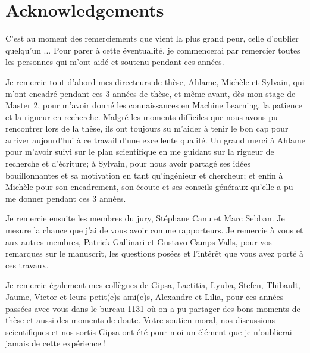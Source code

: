 \chapter*{Acknowledgements}



C'est au moment des remerciements que vient la plus grand peur, celle d'oublier quelqu'un ... Pour parer à cette éventualité, je commencerai par remercier toutes les personnes qui m'ont aidé et soutenu pendant ces années.

Je remercie tout d'abord mes directeurs de thèse, Ahlame, Michèle et Sylvain, qui m'ont encadré pendant ces 3 années de thèse, et même avant, dès mon stage de Master 2, pour m'avoir donné les connaissances en Machine Learning, la patience et la rigueur en recherche. Malgré les moments difficiles que nous avons pu rencontrer lors de la thèse, ils ont toujours su m'aider à tenir le bon cap pour arriver aujourd'hui à ce travail d'une excellente qualité. Un grand merci à Ahlame pour m'avoir suivi sur le plan scientifique en me guidant sur la rigueur de recherche et d'écriture; à Sylvain, pour nous avoir partagé ses idées bouillonnantes et sa motivation en tant qu'ingénieur et chercheur; et enfin à Michèle pour son encadrement, son écoute et ses conseils généraux qu'elle a pu me donner pendant ces 3 années.

Je remercie ensuite les membres du jury, Stéphane Canu et Marc Sebban. Je mesure la chance que j'ai de vous avoir comme rapporteurs. Je remercie à vous et aux autres membres, Patrick Gallinari et Gustavo Camps-Valls, pour vos remarques sur le manuscrit, les questions posées et l'intérêt que vous avez porté à ces travaux.

Je remercie également mes collègues de Gipsa, Laetitia, Lyuba, Stefen, Thibault, Jaume, Victor et leurs petit(e)s ami(e)s, Alexandre et Lilia, pour ces années passées avec vous dans le bureau 1131 où on a pu partager des bons moments de thèse et aussi des moments de doute. Votre soutien moral, nos discussions scientifiques et nos sortis Gipsa ont été pour moi un élément que je n'oublierai jamais de cette expérience !

